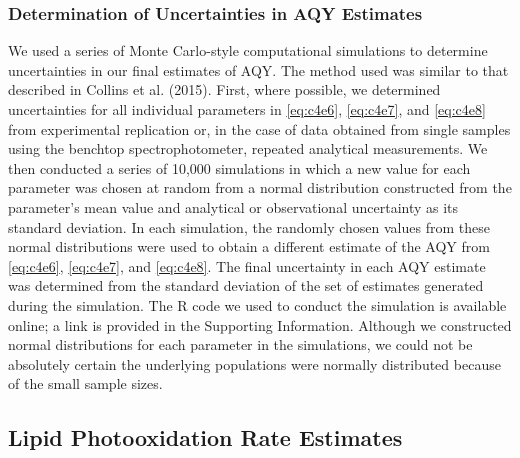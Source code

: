 \subsubsection{Determination of Uncertainties in AQY Estimates}
\label{sssec:Determination of Uncertainties in AQY Estimates}

We used a series of Monte Carlo-style computational simulations to determine uncertainties in our final estimates of AQY. The method used was similar to that described in Collins et al. (2015). First, where possible, we determined uncertainties for all individual parameters in \autoref{eq:c4e6}, \autoref{eq:c4e7}, and \autoref{eq:c4e8} from experimental replication or, in the case of data obtained from single samples using the benchtop spectrophotometer, repeated analytical measurements. We then conducted a series of 10,000 simulations in which a new value for each parameter was chosen at random from a normal distribution constructed from the parameter's mean value and analytical or observational uncertainty as its standard deviation. In each simulation, the randomly chosen values from these normal distributions were used to obtain a different estimate of the AQY from \autoref{eq:c4e6}, \autoref{eq:c4e7}, and \autoref{eq:c4e8}. The final uncertainty in each AQY estimate was determined from the standard deviation of the set of estimates generated during the simulation. The R code we used to conduct the simulation is available online; a link is provided in the Supporting Information. Although we constructed normal distributions for each parameter in the simulations, we could not be absolutely certain the underlying populations were normally distributed because of the small sample sizes.

\subsection{Lipid Photooxidation Rate Estimates}


